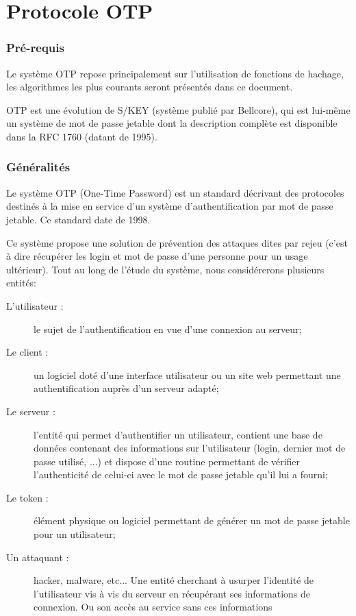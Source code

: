 \documentclass{../res/univ-projet}
\begin{document}
\part{Protocole OTP}
\setcounter{section}{0}
\section{Pré-requis}
  Le système OTP repose principalement sur l'utilisation de fonctions de 
  hachage, les algorithmes les plus courants seront présentés dans ce 
  document.

  OTP est une évolution de S/KEY (système publié par Bellcore), qui est 
  lui-même un système de mot de passe jetable dont la description complète est disponible
  dans la RFC 1760 (datant de 1995).

\section{Généralités}
  Le système OTP (One-Time Password) est un standard décrivant des protocoles 
destinés à la mise en service d'un système d'authentification par mot de passe 
jetable. Ce standard date de 1998.

  Ce système propose une solution de prévention des attaques dites \og par 
rejeu\fg{} (c'est à dire récupérer les login et mot de passe d'une personne pour un 
usage ultérieur). Tout au long de l'étude du système, nous considérerons plusieurs 
entités:

  \begin{description}
    \item[L'utilisateur :] le sujet de l'authentification en vue d'une 
    connexion au serveur;
    \item[Le client :] un logiciel doté d'une interface utilisateur ou un site 
    web permettant une authentification auprès d'un serveur adapté;
    \item[Le serveur :] l'entité qui permet d'authentifier un utilisateur,
    contient une base de données contenant des informations sur l'utilisateur 
    (login, dernier mot de 
    passe utilisé, ...) et dispose d'une routine permettant de vérifier 
    l'authenticité de celui-ci avec le mot de passe jetable qu'il lui a fourni;
    \item[Le token :] élément physique ou logiciel permettant de générer un mot 
    de passe jetable pour un utilisateur;
    \item[Un attaquant :] hacker, malware, etc... Une entité cherchant à 
    usurper 
    l'identité de l'utilisateur vis à vis du serveur en récupérant ses informations 
    de connexion. Ou son accès au service sans ces informations\\
  \end{description}
\end{document}
